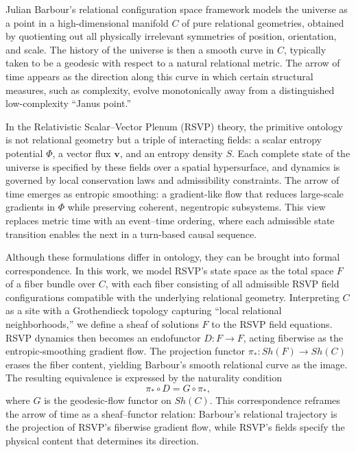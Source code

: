\documentclass[11pt]{article}
\theoremstyle{plain}
\theoremstyle{definition}
\begin{document}
Julian Barbour’s relational configuration space framework models the universe as a point in a high-dimensional manifold $C$ of pure relational geometries, obtained by quotienting out all physically irrelevant symmetries of position, orientation, and scale. The history of the universe is then a smooth curve in $C$, typically taken to be a geodesic with respect to a natural relational metric. The arrow of time appears as the direction along this curve in which certain structural measures, such as complexity, evolve monotonically away from a distinguished low-complexity “Janus point.”

In the Relativistic Scalar–Vector Plenum (RSVP) theory, the primitive ontology is not relational geometry but a triple of interacting fields: a scalar entropy potential $\Phi$, a vector flux $\mathbf{v}$, and an entropy density $S$. Each complete state of the universe is specified by these fields over a spatial hypersurface, and dynamics is governed by local conservation laws and admissibility constraints. The arrow of time emerges as entropic smoothing: a gradient-like flow that reduces large-scale gradients in $\Phi$ while preserving coherent, negentropic subsystems. This view replaces metric time with an event–time ordering, where each admissible state transition enables the next in a turn-based causal sequence.

Although these formulations differ in ontology, they can be brought into formal correspondence. In this work, we model RSVP’s state space as the total space $F$ of a fiber bundle over $C$, with each fiber consisting of all admissible RSVP field configurations compatible with the underlying relational geometry. Interpreting $C$ as a site with a Grothendieck topology capturing “local relational neighborhoods,” we define a sheaf of solutions $F$ to the RSVP field equations. RSVP dynamics then becomes an endofunctor $D : F \to F$, acting fiberwise as the entropic-smoothing gradient flow. The projection functor $\pi_* : Sh(F) \to Sh(C)$ erases the fiber content, yielding Barbour’s smooth relational curve as the image. The resulting equivalence is expressed by the naturality condition
\[
\pi_* \circ D = G \circ \pi_* ,
\]
where $G$ is the geodesic-flow functor on $Sh(C)$. This correspondence reframes the arrow of time as a sheaf–functor relation: Barbour’s relational trajectory is the projection of RSVP’s fiberwise gradient flow, while RSVP’s fields specify the physical content that determines its direction.
\end{document}
